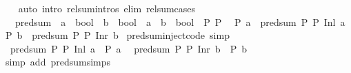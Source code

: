 \begin{isabellebody}
%
\isadelimproof
\ \ %
\endisadelimproof
%
\isatagproof
{}\isamarkupfalse%
\ {\isacharparenleft}{\kern0pt}auto\ intro{\isacharcolon}{\kern0pt}\ rel{\isacharunderscore}{\kern0pt}sum{\isachardot}{\kern0pt}intros\ elim{\isacharcolon}{\kern0pt}\ rel{\isacharunderscore}{\kern0pt}sum{\isachardot}{\kern0pt}cases{\isacharparenright}{\kern0pt}%
\endisatagproof
{\isafoldproof}%
%
\isadelimproof
\isanewline
%
\endisadelimproof
\isanewline
{}\isamarkupfalse%
\isanewline
\ \ \ pred{\isacharunderscore}{\kern0pt}sum\ {\isacharcolon}{\kern0pt}{\isacharcolon}{\kern0pt}\ {\isachardoublequoteopen}{\isacharparenleft}{\kern0pt}{\isacharprime}{\kern0pt}a\ {\isasymRightarrow}\ bool{\isacharparenright}{\kern0pt}\ {\isasymRightarrow}\ {\isacharparenleft}{\kern0pt}{\isacharprime}{\kern0pt}b\ {\isasymRightarrow}\ bool{\isacharparenright}{\kern0pt}\ {\isasymRightarrow}\ {\isacharprime}{\kern0pt}a\ {\isacharplus}{\kern0pt}\ {\isacharprime}{\kern0pt}b\ {\isasymRightarrow}\ bool{\isachardoublequoteclose}\ \ P{}\ P{}\isanewline
{}\isanewline
\ \ {\isachardoublequoteopen}P{}\ a\ {\isasymLongrightarrow}\ pred{\isacharunderscore}{\kern0pt}sum\ P{}\ P{}\ {\isacharparenleft}{\kern0pt}Inl\ a{\isacharparenright}{\kern0pt}{\isachardoublequoteclose}\isanewline
{\isacharbar}{\kern0pt}\ {\isachardoublequoteopen}P{}\ b\ {\isasymLongrightarrow}\ pred{\isacharunderscore}{\kern0pt}sum\ P{}\ P{}\ {\isacharparenleft}{\kern0pt}Inr\ b{\isacharparenright}{\kern0pt}{\isachardoublequoteclose}\isanewline
\isanewline
{}\isamarkupfalse%
\ pred{\isacharunderscore}{\kern0pt}sum{\isacharunderscore}{\kern0pt}inject{\isacharbrackleft}{\kern0pt}code{\isacharcomma}{\kern0pt}\ simp{\isacharbrackright}{\kern0pt}{\isacharcolon}{\kern0pt}\isanewline
\ \ {\isachardoublequoteopen}pred{\isacharunderscore}{\kern0pt}sum\ P{}\ P{}\ {\isacharparenleft}{\kern0pt}Inl\ a{\isacharparenright}{\kern0pt}\ {\isasymlongleftrightarrow}\ P{}\ a{\isachardoublequoteclose}\isanewline
\ \ {\isachardoublequoteopen}pred{\isacharunderscore}{\kern0pt}sum\ P{}\ P{}\ {\isacharparenleft}{\kern0pt}Inr\ b{\isacharparenright}{\kern0pt}\ {\isasymlongleftrightarrow}\ P{}\ b{\isachardoublequoteclose}\isanewline
%
\isadelimproof
\ \ %
\endisadelimproof
%
\isatagproof
{}\isamarkupfalse%
\ {\isacharparenleft}{\kern0pt}simp\ add{\isacharcolon}{\kern0pt}\ pred{\isacharunderscore}{\kern0pt}sum{\isachardot}{\kern0pt}simps{\isacharparenright}{\kern0pt}{\isacharplus}{\kern0pt}%

\end{isabellebody}
